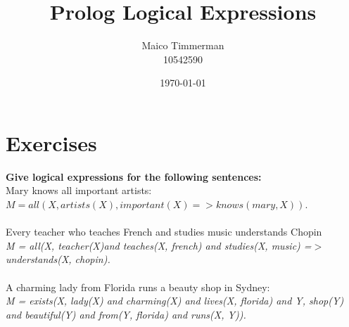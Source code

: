 \documentclass[12pt]{article}
\title{Prolog Logical Expressions}
\author{%
    Maico Timmerman\\%
    10542590%
}
\date{\today}
\begin{document}
\maketitle

\section{Exercises}

\textbf{Give logical expressions for the following sentences:}\\
Mary knows all important artists:\\
$M = all(X, artists(X), important(X) => knows(mary, X))$.\\
\\
Every teacher who teaches French and studies music understands Chopin\\
\emph{M = all(X, teacher(X)and teaches(X, french) and studies(X, music) =$>$ understands(X, chopin).}\\
\\
A charming lady from Florida runs a beauty shop in Sydney:\\
\emph{M = exists(X, lady(X) and charming(X) and lives(X, florida) and Y, shop(Y) and beautiful(Y) and from(Y, florida) and runs(X, Y)).}
\end{document}
